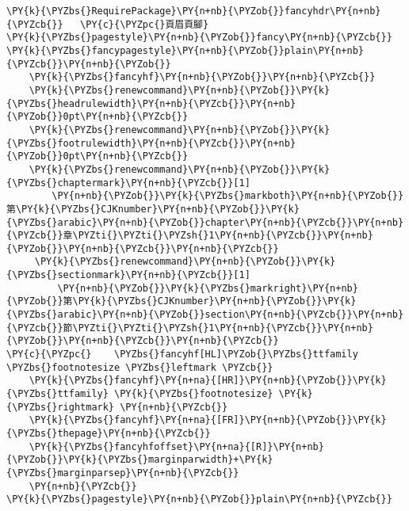 \begin{Verbatim}[commandchars=\\\{\}]
\PY{k}{\PYZbs{}RequirePackage}\PY{n+nb}{\PYZob{}}fancyhdr\PY{n+nb}{\PYZcb{}}   \PY{c}{\PYZpc{}頁眉頁腳}
\PY{k}{\PYZbs{}pagestyle}\PY{n+nb}{\PYZob{}}fancy\PY{n+nb}{\PYZcb{}}
\PY{k}{\PYZbs{}fancypagestyle}\PY{n+nb}{\PYZob{}}plain\PY{n+nb}{\PYZcb{}}\PY{n+nb}{\PYZob{}}
    \PY{k}{\PYZbs{}fancyhf}\PY{n+nb}{\PYZob{}}\PY{n+nb}{\PYZcb{}}
    \PY{k}{\PYZbs{}renewcommand}\PY{n+nb}{\PYZob{}}\PY{k}{\PYZbs{}headrulewidth}\PY{n+nb}{\PYZcb{}}\PY{n+nb}{\PYZob{}}0pt\PY{n+nb}{\PYZcb{}}
    \PY{k}{\PYZbs{}renewcommand}\PY{n+nb}{\PYZob{}}\PY{k}{\PYZbs{}footrulewidth}\PY{n+nb}{\PYZcb{}}\PY{n+nb}{\PYZob{}}0pt\PY{n+nb}{\PYZcb{}}
    \PY{k}{\PYZbs{}renewcommand}\PY{n+nb}{\PYZob{}}\PY{k}{\PYZbs{}chaptermark}\PY{n+nb}{\PYZcb{}}[1]
        \PY{n+nb}{\PYZob{}}\PY{k}{\PYZbs{}markboth}\PY{n+nb}{\PYZob{}}第\PY{k}{\PYZbs{}CJKnumber}\PY{n+nb}{\PYZob{}}\PY{k}{\PYZbs{}arabic}\PY{n+nb}{\PYZob{}}chapter\PY{n+nb}{\PYZcb{}}\PY{n+nb}{\PYZcb{}}章\PYZti{}\PYZti{}\PYZsh{}1\PY{n+nb}{\PYZcb{}}\PY{n+nb}{\PYZob{}}\PY{n+nb}{\PYZcb{}}\PY{n+nb}{\PYZcb{}}
     \PY{k}{\PYZbs{}renewcommand}\PY{n+nb}{\PYZob{}}\PY{k}{\PYZbs{}sectionmark}\PY{n+nb}{\PYZcb{}}[1]
         \PY{n+nb}{\PYZob{}}\PY{k}{\PYZbs{}markright}\PY{n+nb}{\PYZob{}}第\PY{k}{\PYZbs{}CJKnumber}\PY{n+nb}{\PYZob{}}\PY{k}{\PYZbs{}arabic}\PY{n+nb}{\PYZob{}}section\PY{n+nb}{\PYZcb{}}\PY{n+nb}{\PYZcb{}}節\PYZti{}\PYZti{}\PYZsh{}1\PY{n+nb}{\PYZcb{}}\PY{n+nb}{\PYZob{}}\PY{n+nb}{\PYZcb{}}\PY{n+nb}{\PYZcb{}}
\PY{c}{\PYZpc{}    \PYZbs{}fancyhf[HL]\PYZob{}\PYZbs{}ttfamily \PYZbs{}footnotesize \PYZbs{}leftmark \PYZcb{}}
    \PY{k}{\PYZbs{}fancyhf}\PY{n+na}{[HR]}\PY{n+nb}{\PYZob{}}\PY{k}{\PYZbs{}ttfamily} \PY{k}{\PYZbs{}footnotesize} \PY{k}{\PYZbs{}rightmark} \PY{n+nb}{\PYZcb{}}
    \PY{k}{\PYZbs{}fancyhf}\PY{n+na}{[FR]}\PY{n+nb}{\PYZob{}}\PY{k}{\PYZbs{}thepage}\PY{n+nb}{\PYZcb{}}
    \PY{k}{\PYZbs{}fancyhfoffset}\PY{n+na}{[R]}\PY{n+nb}{\PYZob{}}\PY{k}{\PYZbs{}marginparwidth}+\PY{k}{\PYZbs{}marginparsep}\PY{n+nb}{\PYZcb{}}
    \PY{n+nb}{\PYZcb{}}
\PY{k}{\PYZbs{}pagestyle}\PY{n+nb}{\PYZob{}}plain\PY{n+nb}{\PYZcb{}}
\end{Verbatim}
